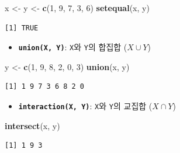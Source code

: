 \documentclass[
  11pt,
]{krantz}
\newenvironment{Shaded}{\begin{snugshade}}{\end{snugshade}}
\newcommand{\DecValTok}[1]{\textcolor[rgb]{0.06,0.06,0.06}{#1}}
\newcommand{\KeywordTok}[1]{\textcolor[rgb]{0.27,0.27,0.27}{\textbf{#1}}}
\newcommand{\NormalTok}[1]{#1}
\newcommand{\StringTok}[1]{\textcolor[rgb]{0.5,0.5,0.5}{#1}}
\providecommand{\tightlist}{%
  \setlength{\itemsep}{0pt}\setlength{\parskip}{0pt}}
\begin{document}
\footnotesize

\begin{Shaded}
\begin{Highlighting}[]
\NormalTok{x <-}\StringTok{ }\NormalTok{y <-}\StringTok{ }\KeywordTok{c}\NormalTok{(}\DecValTok{1}\NormalTok{, }\DecValTok{9}\NormalTok{, }\DecValTok{7}\NormalTok{, }\DecValTok{3}\NormalTok{, }\DecValTok{6}\NormalTok{)}
\KeywordTok{setequal}\NormalTok{(x, y)}
\end{Highlighting}
\end{Shaded}

\begin{verbatim}
[1] TRUE
\end{verbatim}

\normalsize

\begin{itemize}
\tightlist
\item
  \textbf{\texttt{union(X,\ Y)}}: \texttt{X}와 \texttt{Y}의 합집합 (\(X \cup Y\))
\end{itemize}

\footnotesize

\begin{Shaded}
\begin{Highlighting}[]
\NormalTok{y <-}\StringTok{ }\KeywordTok{c}\NormalTok{(}\DecValTok{1}\NormalTok{, }\DecValTok{9}\NormalTok{, }\DecValTok{8}\NormalTok{, }\DecValTok{2}\NormalTok{, }\DecValTok{0}\NormalTok{, }\DecValTok{3}\NormalTok{)}
\KeywordTok{union}\NormalTok{(x, y)}
\end{Highlighting}
\end{Shaded}

\begin{verbatim}
[1] 1 9 7 3 6 8 2 0
\end{verbatim}

\normalsize

\begin{itemize}
\tightlist
\item
  \textbf{\texttt{interaction(X,\ Y)}}: \texttt{X}와 \texttt{Y}의 교집합 (\(X \cap Y\))
\end{itemize}

\footnotesize

\begin{Shaded}
\begin{Highlighting}[]
\KeywordTok{intersect}\NormalTok{(x, y)}
\end{Highlighting}
\end{Shaded}

\begin{verbatim}
[1] 1 9 3
\end{verbatim}
\end{document}
